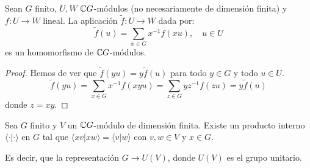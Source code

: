 \begin{lema}
  Sean \(G\) finito, \(U,W\) \(\mathbb{C} G\)-módulos (no necesariamente de dimensión
  finita) y \(f:U\longrightarrow W\) lineal. La aplicación \(\tilde{f}:
  U\longrightarrow W\) dada por:
  \[
    \tilde{f}(u)=\sum_{x\in G}x^{-1}f(xu), \quad u\in U
  \]
  es un homomorfismo de \(\mathbb{C} G\)-módulos.

\end{lema}
\begin{proof}
  Hemos de ver que \(\tilde{f}(yu)=y\tilde{f}(u)\) para todo \(y\in G\)
  y todo \(u\in U\).
  \[
    \tilde{f}(yu)=\sum_{x\in G} x^{-1}f(xyu)=\sum_{z\in G} yz^{-1}
    f(zu)=y\tilde{f}(u)
  \]
  donde \(z=xy\).
\end{proof}

\begin{lema}
  Sea \(G\) finito y \(V\) un \(\mathbb{C} G\)-módulo de dimensión finita.
  Existe un producto interno \(\langle\cdot|\cdot\rangle\) en \(G\)
  tal que \(\langle xv|xw\rangle =\langle v|w\rangle\) con \(v,w\in V\)
  y \(x\in G\).

  Es decir, que la representación \(G\longrightarrow U(V)\), donde
  \(U(V)\) es el grupo unitario.
\end{lema}


